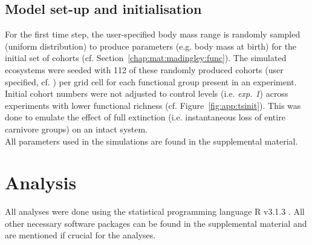 \subsection{Model set-up and initialisation}
For the first time step, the user-specified body mass range is randomly sampled (uniform distribution) to produce parameters (e.g. body mass at birth) for the initial set of  cohorts (cf. Section~\ref{chap:mat:madingley:func}).
The simulated ecosystems were seeded with 112 of these randomly produced cohorts (user specified, cf. \citealp{Harfoot2014}) per grid cell for each functional group present in an experiment.\\
Initial cohort numbers were not adjusted to control levels (i.e. \textit{exp. 1}) across experiments with lower functional richness (cf. Figure~\ref{fig:app:tsinit}). This was done to emulate the effect of full extinction (i.e. instantaneous loss of entire carnivore groups) on an intact system.\\
All parameters used in the simulations are found in the supplemental material. 

%

\section{Analysis}
\label{chap:mat:analysis}
All analyses were done using the statistical programming language \textsc{R} v3.1.3 \citep{RCT2015}. All other necessary software packages can be found in the supplemental material and are mentioned if crucial for the analyses.
